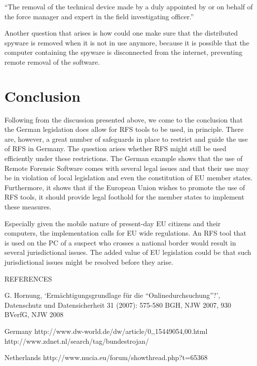 \documentclass[11pt]{article} %
\begin{document}
``The removal of the technical device made by a duly appointed by or on behalf of the force manager and expert in the field investigating officer.''

Another question that arises is how could one make sure that the distributed spyware is removed when it is not in use anymore, because it is possible that the computer containing the spyware is disconnected from the internet, preventing remote removal of the software.



\section{Conclusion}
Following from the discussion presented above, we come to the conclusion that the German legislation does allow for RFS tools to be used, in principle.
There are, however, a great number of safeguards in place to restrict and guide the use of RFS in Germany.
The question arises whether RFS might still be used efficiently under these restrictions.
The German example shows that the use of Remote Forensic Software comes with several legal issues and that their use may be in violation of local legislation and even the constitution of EU member states.
Furthermore, it shows that if the European Union wishes to promote the use of RFS tools, it should provide legal foothold for the member states to implement these measures.

Especially given the mobile nature of present-day EU citizens and their computers, the implementation calls for EU wide regulations.
An RFS tool that is used on the PC of a suspect who crosses a national border would result in several jurisdictional issues.
The added value of EU legislation could be that such jurisdictional issues might be resolved before they arise.


REFERENCES

    G. Hornung, `Ermächtigungsgrundlage für die “Onlinedurchsuchung”?', Datenschutz und Datensicherheit 31 (2007): 575-580
    BGH, NJW 2007, 930
    BVerfG, NJW 2008




Germany
http://www.dw-world.de/dw/article/0,,15449054,00.html
http://www.zdnet.nl/search/tag/bundestrojan/

Netherlands
http://www.nucia.eu/forum/showthread.php?t=65368

\end{document}
